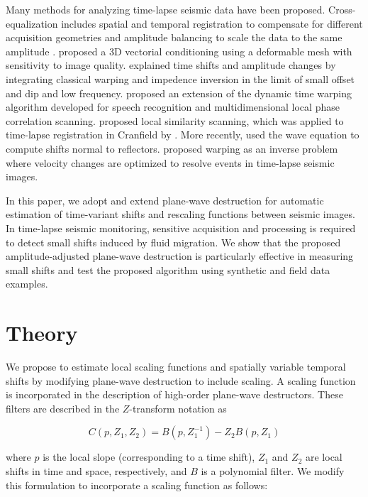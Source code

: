 Many methods for analyzing time-lapse seismic data have 
been proposed. Cross-equalization includes spatial and temporal registration to 
compensate for different acquisition geometries and amplitude balancing to 
scale the data to the same amplitude \cite[]{rickett}. \cite{hall} proposed a 
3D vectorial conditioning using a deformable mesh with sensitivity to image 
quality. \cite{williamson} explained time shifts and amplitude changes 
by integrating classical warping and impedence inversion in the limit 
of small offset and dip and low frequency. \cite{hale09,hale13} proposed an 
extension of the dynamic time warping algorithm developed for speech 
recognition and multidimensional local phase correlation scanning. 
\cite{fomel09} proposed local similarity scanning, which was applied to 
time-lapse registration in Cranfield by \cite{zhang13,zhang14}. More recently, 
\cite{khalil} used the wave equation to compute shifts normal to reflectors. 
\cite{baek} proposed warping as an inverse problem where velocity changes are 
optimized to resolve events in time-lapse seismic images.

In this paper, we adopt and extend plane-wave destruction \cite[]{fomel02,chena} for 
automatic estimation of time-variant shifts and rescaling functions between 
seismic images. In time-lapse seismic monitoring, sensitive acquisition and 
processing is required to detect small shifts induced by fluid migration. 
We show that the proposed amplitude-adjusted plane-wave destruction is particularly 
effective in measuring small shifts and test the proposed algorithm using 
synthetic and field data examples.

\section{Theory}
We propose to estimate local scaling functions and spatially variable temporal 
shifts by modifying plane-wave destruction \cite[]{fomel02} to include scaling. 
A scaling function is incorporated in the description of high-order plane-wave 
destructors. These filters are described in the $Z$-transform notation as

\begin{equation}
C(p,Z_1,Z_2) = B(p,Z_1^{-1}) - Z_2B(p,Z_1)
\end{equation}

where $p$ is the local slope (corresponding to a time shift), $Z_1$ and $Z_2$ 
are local shifts in time and space, respectively, and $B$ is a polynomial filter. We modify this formulation to incorporate a scaling 
function as follows:

